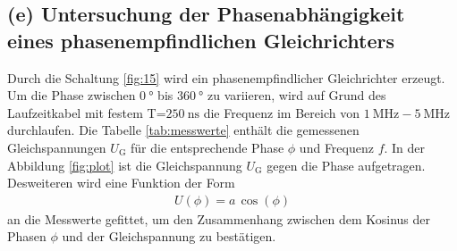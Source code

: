 \FloatBarrier
\subsection{(e) Untersuchung der Phasenabhängigkeit eines
phasenempfindlichen Gleichrichters}
\label{subsec:auswertung_e}
Durch die Schaltung \ref{fig:15} wird ein phasenempfindlicher
Gleichrichter erzeugt. Um die Phase \phi zwischen
$\SI{0}{\degree}$ bis $\SI{360}{\degree}$ zu variieren, wird
auf Grund des Laufzeitkabel mit festem T=$\SI{250}{\nano\second}$
die Frequenz im Bereich von $\SI{1}{\mega\hertz}-\SI{5}{\mega\hertz}$
durchlaufen. Die Tabelle \ref{tab:messwerte} enthält die gemessenen
Gleichspannungen $U_{\text{G}}$ für die entsprechende Phase $\phi$ und Frequenz $f$.
In der Abbildung \ref{fig:plot} ist die Gleichspannung $U_{\text{G}}$
gegen die Phase aufgetragen.
Desweiteren wird eine Funktion der Form
\begin{align}
  U(\phi)=a \, \cos(\phi)
\end{align}
an die Messwerte gefittet,
um den Zusammenhang zwischen dem Kosinus der
Phasen $\phi$ und der Gleichspannung zu bestätigen.
\
